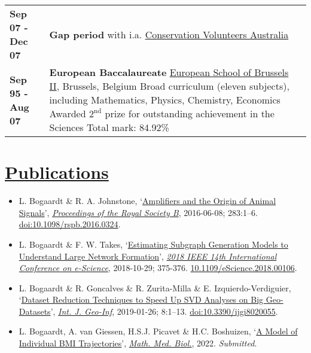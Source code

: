 \documentclass[a4paper,8pt]{extarticle}
\begin{document}
\begin{center}
\begin{tabular}{p{}p{}}
\textbf{Sep 07 - Dec 07}&\textbf{Gap period} with i.a. \href{http://conservationvolunteers.com.au}{Conservation Volunteers Australia}
\vspace{2mm}\\
\textbf{Sep 95 - Aug 07}&\textbf{European Baccalaureate}\newline
\href{http://www.eeb2.be/site/}{European School of Brussels II}, Brussels, Belgium\newline
Broad curriculum (eleven subjects), including Mathematics, Physics, Chemistry, Economics\newline
Awarded $2^\text{nd}$ prize for outstanding achievement in the Sciences\newline
Total mark: 84.92\%
\end{tabular}
\end{center}

\vspace{-1mm}

\section*{\href{http://www.lbogaardt.eu}{Publications}}

\enlargethispage{20mm}

\begin{itemize}[leftmargin=*]
\setlength{\itemsep}{-0.7mm}
\item L. Bogaardt \& R. A. Johnstone, `\href{http://www.lbogaardt.eu/?s=m2p}{Amplifiers and the Origin of Animal Signals}', \textit{\href{http://rspb.royalsocietypublishing.org/content/283/1832/20160324}{Proceedings of the Royal Society B}}, 2016-06-08; 283:1--6. \href{http://doi.org/10.1098/rspb.2016.0324}{doi:10.1098/rspb.2016.0324}.
\item L. Bogaardt \& F. W. Takes, `\href{http://www.lbogaardt.eu/?s=9wn}{Estimating Subgraph Generation Models to Understand Large Network Formation}', \textit{\href{https://ieeexplore.ieee.org/abstract/document/8588725}{2018 IEEE 14th International Conference on e-Science}}, 2018-10-29; 375-376. \href{http://doi.org/10.1109/eScience.2018.00106}{10.1109/eScience.2018.00106}.
\item L. Bogaardt \& R. Goncalves \& R. Zurita-Milla \& E. Izquierdo-Verdiguier, `\href{http://www.lbogaardt.eu/?s=9lc}{Dataset Reduction Techniques to Speed Up SVD Analyses on Big Geo-Datasets}', \textit{\href{https://www.mdpi.com/2220-9964/8/2/55}{Int. J. Geo-Inf}}, 2019-01-26; 8:1--13. \href{http://doi.org/10.3390/ijgi8020055}{doi:10.3390/ijgi8020055}.
\item L. Bogaardt, A. van Giessen, H.S.J. Picavet \& H.C. Boshuizen, `\href{http://www.lbogaardt.eu/?s=7tt}{A Model of Individual BMI Trajectories}', \textit{\href{https://academic.oup.com/imammb}{Math. Med. Biol.}}, 2022. \textit{Submitted}.
\end{itemize}
\end{document}
